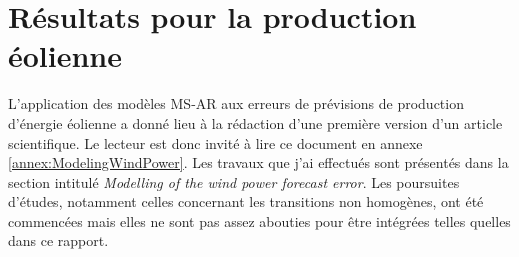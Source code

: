 \documentclass[12pt]{report}
\begin{document}
%
%
 


\chapter{Résultats pour la production éolienne}
\label{seq:ResultatsEolien}

L'application des modèles MS-AR aux erreurs de prévisions de production d'énergie éolienne a donné lieu à la rédaction d'une première version d'un article scientifique. Le lecteur est donc invité à lire ce document en annexe \ref{annex:ModelingWindPower}. Les travaux que j'ai effectués sont présentés dans la section intitulé \textit{Modelling of the wind power forecast error}. Les poursuites d'études, notamment celles concernant les transitions non homogènes, ont été commencées mais elles ne sont pas assez abouties pour être intégrées telles quelles dans ce rapport.
\end{document}
